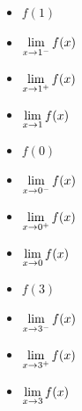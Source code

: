 \documentclass{ximera}
\begin{document}
\begin{ex}
\begin{enumerate}
\begin{multicols}{4}
  \end{multicols}
 
\smallskip
 
  \begin{multicols}{4}
 
 \begin{itemize}
 
 \item $f(1)$
 
 \item  $\ds{ \lim_{x \rightarrow 1^{-}} f(x)}$
 
  \item  $\ds{ \lim_{x \rightarrow 1^{+}} f(x)}$
 
   \item  $\ds{ \lim_{x \rightarrow 1} f(x)}$
 
 \end{itemize}
 
  \end{multicols}
 
\smallskip
 
 \begin{multicols}{4}
 
 \begin{itemize}
 
 \item $f(0)$
 
 \item  $\ds{ \lim_{x \rightarrow 0^{-}} f(x)}$
 
  \item  $\ds{ \lim_{x \rightarrow 0^{+}} f(x)}$
 
  \item  $\ds{ \lim_{x \rightarrow 0} f(x)}$
 
 \end{itemize}
 
  \end{multicols}
 
\smallskip
 
  \begin{multicols}{4}
 
 \begin{itemize}
 
 \item $f(3)$
 
 \item  $\ds{ \lim_{x \rightarrow 3^{-}} f(x)}$
 
  \item  $\ds{ \lim_{x \rightarrow 3^{+}} f(x)}$
 
   \item  $\ds{ \lim_{x \rightarrow 3} f(x)}$
 

\end{itemize}
\end{multicols}
\end{enumerate}
\end{ex}
\end{document}
